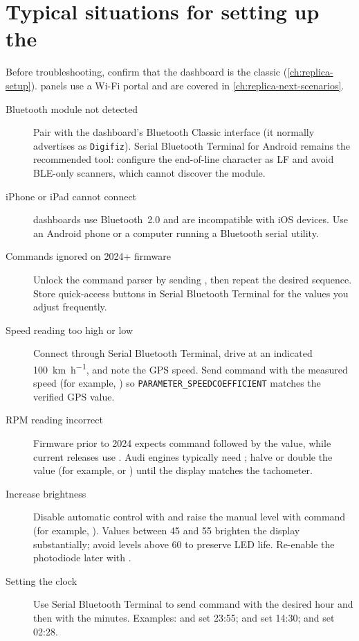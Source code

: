 \chapter{Typical situations for setting up the \ReplicaGenOne{}}\label{ch:replica-scenarios}

Before troubleshooting, confirm that the dashboard is the classic \ReplicaGenOne{} (\autoref{ch:replica-setup}). \ReplicaNextLong{} panels use a Wi-Fi portal and are covered in \autoref{ch:replica-next-scenarios}.

\begin{description}
    \item[Bluetooth module not detected] Pair with the dashboard's Bluetooth Classic interface (it normally advertises as \texttt{Digifiz}). Serial Bluetooth Terminal for Android remains the recommended tool: configure the end-of-line character as LF and avoid BLE-only scanners, which cannot discover the module.
    \item[iPhone or iPad cannot connect] \ReplicaGenOneShort{} dashboards use Bluetooth~2.0 and are incompatible with iOS devices. Use an Android phone or a computer running a Bluetooth serial utility.
    \item[Commands ignored on 2024+ firmware] Unlock the command parser by sending , then repeat the desired sequence. Store quick-access buttons in Serial Bluetooth Terminal for the values you adjust frequently.
    \item[Speed reading too high or low] Connect through Serial Bluetooth Terminal, drive at an indicated \SI{100}{\kilo\metre\per\hour}, and note the GPS speed. Send command  with the measured speed (for example, ) so \texttt{PARAMETER\_SPEEDCOEFFICIENT} matches the verified GPS value.
    \item[RPM reading incorrect] Firmware prior to 2024 expects command  followed by the value, while current releases use . Audi engines typically need ; halve or double the value (for example,  or ) until the display matches the tachometer.
    \item[Increase brightness] Disable automatic control with  and raise the manual level with command  (for example, ). Values between 45 and 55 brighten the display substantially; avoid levels above 60 to preserve LED life. Re-enable the photodiode later with .
    \item[Setting the clock] Use Serial Bluetooth Terminal to send command  with the desired hour and then  with the minutes. Examples:  and  set 23:55;  and  set 14:30;  and  set 02:28.

\end{description}
